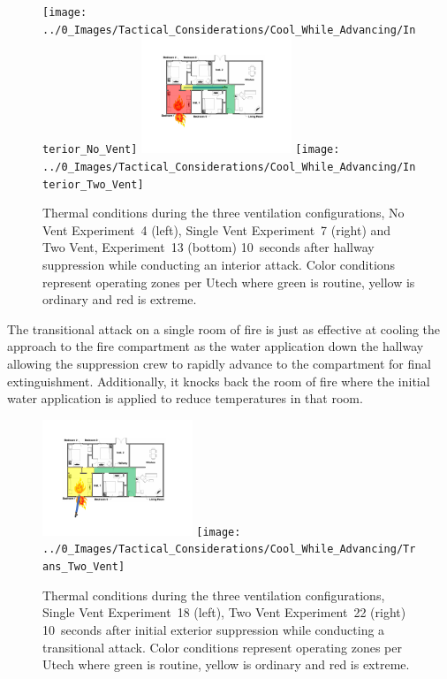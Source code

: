 \documentclass[12pt,oneside]{book}
\begin{document}
\begin{figure}[H]
\centering
\texttt{[image: ../0\_Images/Tactical\_Considerations/Cool\_While\_Advancing/Interior\_No\_Vent]}
\includegraphics[width=0.4\textwidth]{../0_Images/Tactical_Considerations/Cool_While_Advancing/Interior_Single_Vent}
\texttt{[image: ../0\_Images/Tactical\_Considerations/Cool\_While\_Advancing/Interior\_Two\_Vent]}
\caption[Thermal Conditions - Interior Attack]{Thermal conditions during the three ventilation configurations, No Vent Experiment~4 (left), Single Vent Experiment~7 (right) and Two Vent, Experiment~13 (bottom) 10~seconds after hallway suppression while conducting an interior attack. Color conditions represent operating zones per Utech \cite{Utech_Firefighter_Clothing} where green is routine, yellow is ordinary and red is extreme.}
\label{fig:Thermal_Classes_Approach_Interior}
\end{figure}

The transitional attack on a single room of fire is just as effective at cooling the approach to the fire compartment as the water application down the hallway allowing the suppression crew to rapidly advance to the compartment for final extinguishment. Additionally, it knocks back the room of fire where the initial water application is applied to reduce temperatures in that room.

\begin{figure}[H]
\centering
\includegraphics[width=0.4\textwidth]{../0_Images/Tactical_Considerations/Cool_While_Advancing/Trans_Single_Vent}
\texttt{[image: ../0\_Images/Tactical\_Considerations/Cool\_While\_Advancing/Trans\_Two\_Vent]}
\caption[Thermal Conditions - Transitional Attack]{Thermal conditions during the three ventilation configurations, Single Vent Experiment~18 (left), Two Vent Experiment~22 (right) 10~seconds after initial exterior suppression while conducting a transitional attack. Color conditions represent operating zones per Utech \cite{Utech_Firefighter_Clothing} where green is routine, yellow is ordinary and red is extreme.}
\label{fig:Thermal_Classes_Approach_Transitional}
\end{figure}
\end{document}
